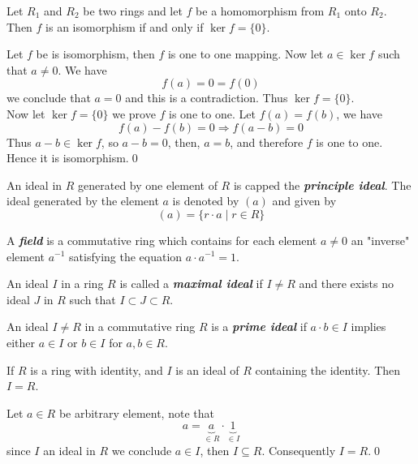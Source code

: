 \begin{theo}
    Let \(R_1\) and \(R_2\) be two rings and let \(f\) be a homomorphism from \(R_1\) onto \(R_2\). Then \(f\) is an isomorphism if and only if \(\ker{f}=\{0\}\).
\end{theo}
\begin{myproof}
    Let \(f\) be is isomorphism, then \(f\) is one to one mapping. Now let \(a\in\ker{f}\) such that \(a\neq 0\). We have
    \[
    f(a)=0=f(0)
    \]
    we conclude that \(a=0\) and this is a contradiction. Thus \(\ker{f}=\{0\}\).\\
    Now let \(\ker{f}=\{0\}\) we prove \(f\) is one to one. Let \(f(a)=f(b)\), we have
\[
f(a)-f(b)=0\Longrightarrow f(a-b)=0
\]
Thus \(a-b\in \ker{f}\), so \(a-b=0\), then, \(a=b\), and therefore \(f\) is one to one. Hence it is isomorphism.\qed
\end{myproof}

\begin{mydef}
    An ideal in \(R\) generated by one element of \(R\) is capped the \textbf{\textit{principle ideal}}. The ideal generated by the element \(a\) is denoted by \((a)\) and given by
    \[
    (a)=\{r\cdot a\mid r\in R\}
    \]
\end{mydef}

\begin{mydef}
    A \textbf{\textit{field}} is a commutative ring which contains for each element \(a\neq0\) an "inverse" element \(a^{-1}\) satisfying the equation \(a\cdot a^{-1}=1\).
\end{mydef}

\begin{mydef}
    An ideal \(I\) in a ring \(R\) is called a \textbf{\textit{maximal ideal}} if \(I\neq R\) and there exists no ideal \(J\) in \(R\) such that \(I\subset J\subset R\).
\end{mydef}

\begin{mydef}
    An ideal \(I\neq R\) in a commutative ring \(R\) is a \textbf{\textit{prime ideal}} if \(a\cdot b\in I\) implies either \(a\in I\) or \(b\in I\) for \(a,b\in R\).
\end{mydef}

\begin{theo}
    If \(R\) is a ring with identity, and \(I\) is an ideal of \(R\) containing the identity. Then \(I=R\).
\end{theo}
\begin{myproof}
    Let \(a\in R\) be arbitrary element, note that
\[
a=\underbrace{a}_{\in R}\cdot\underbrace{1}_{\in I}
\]
since \(I\) an ideal in \(R\) we conclude \(a\in I\), then \(I\subseteq R\). Consequently \(I=R\).\qed
\end{myproof}

